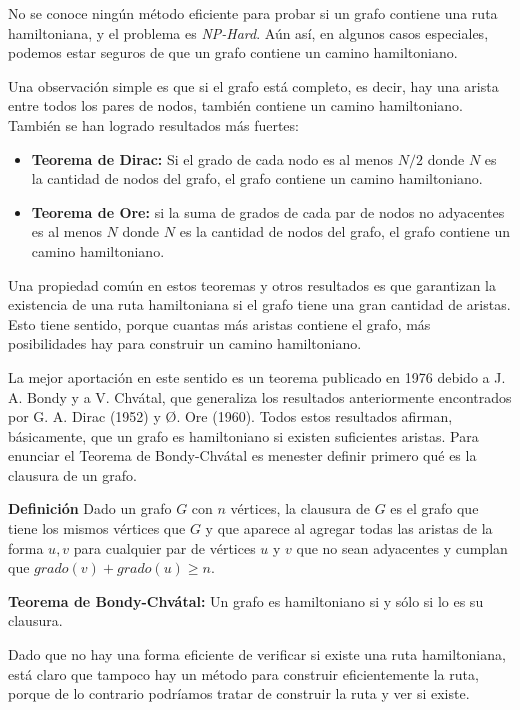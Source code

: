 No se conoce ningún método eficiente para probar si un grafo contiene una ruta hamiltoniana, y el problema es \emph{NP-Hard}. Aún así, en algunos casos especiales, podemos estar seguros de que un grafo contiene un camino hamiltoniano.

Una observación simple es que si el grafo está completo, es decir, hay una arista entre todos los pares de nodos, también contiene un camino hamiltoniano. También se han logrado resultados más fuertes:

\begin{itemize}
	\item \textbf{Teorema de Dirac:} Si el grado de cada nodo es al menos $N /2$ donde $N$ es la cantidad de nodos del grafo, el grafo contiene un camino hamiltoniano.
	\item \textbf{Teorema de Ore:} si la suma de grados de cada par de nodos no adyacentes es al menos $N$ donde $N$ es la cantidad de nodos del grafo, el grafo contiene un camino hamiltoniano.
\end{itemize}

Una propiedad común en estos teoremas y otros resultados es que garantizan la existencia de una ruta hamiltoniana si el grafo tiene una gran cantidad de aristas. Esto tiene sentido, porque cuantas más aristas contiene el grafo, más posibilidades hay para construir un camino hamiltoniano.

La mejor aportación en este sentido es un teorema publicado en 1976 debido a J. A. Bondy y a V. Chvátal, que generaliza los resultados anteriormente encontrados por G. A. Dirac (1952) y Ø. Ore (1960). Todos estos resultados afirman, básicamente, que un grafo es hamiltoniano si existen suficientes aristas. Para enunciar el Teorema de Bondy-Chvátal es menester definir primero qué es la clausura de un grafo.

\textbf{Definición} Dado un grafo $G$ con $n$ vértices, la clausura de $G$ es el grafo que tiene los mismos vértices que $G$ y que aparece al agregar todas las aristas de la forma ${u, v}$ para cualquier par de vértices $u$ y $v$ que no sean adyacentes y cumplan que $grado(v) + grado(u) \ge n$.  

\textbf{Teorema de Bondy-Chvátal:} Un grafo es hamiltoniano si y sólo si lo es su clausura.

Dado que no hay una forma eficiente de verificar si existe una ruta hamiltoniana, está claro que tampoco hay un método para construir eficientemente la ruta, porque de lo contrario podríamos tratar de construir la ruta y ver si existe.

